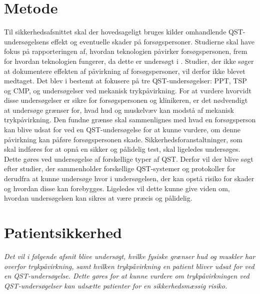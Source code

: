 \section{Metode}
Til sikkerhedsafsnittet skal der hovedsageligt bruges kilder omhandlende QST-undersøgelsens effekt og eventuelle skader på forsøgspersoner. Studierne skal have fokus på rapporteringen af, hvordan teknologien påvirker forsøgspersonen, frem for hvordan teknologien fungerer, da dette er undersøgt i . Studier, der ikke søger at dokumentere effekten af påvirkning af forsøgspersoner, vil derfor ikke blevet medtaget. Det blev i  bestemt at fokusere på tre QST-undersøgelser: PPT, TSP og CMP, og undersøgelser ved mekanisk trykpåvirkning. For at vurdere hvorvidt disse undersøgelser er sikre for forsøgspersonen og klinikeren, er det nødvendigt at undersøge grænser for, hvad hud og muskelvæv kan modstå af mekanisk trykpåvirkning. Den fundne grænse skal sammenlignes med hvad en forsøgsperson kan blive udsat for ved en QST-undersøgelse for at kunne vurdere, om denne påvirkning kan påføre forsøgspersonen skade. Sikkerhedsforanstaltninger, som skal indføres for at opnå en sikker og pålidelig test, skal ligeledes undersøges. Dette gøres ved undersøgelse af forskellige typer af QST. Derfor vil der blive søgt efter studier, der sammenholder forskellige QST-systemer og protokoller for derudfra at kunne undersøge hvor i undersøgelsen, der kan opstå risiko for skader og hvordan disse kan forebygges. Ligeledes vil dette kunne give viden om, hvordan undersøgelsen kan sikres at være præcis og pålidelig. \citep{HTAcore}

\section{Patientsikkerhed}
\textit{Det vil i følgende afsnit blive undersøgt, hvilke fysiske grænser hud og muskler har overfor trykpåvirkning, samt hvilken trykpåvirkning en patient bliver udsat for ved en QST-undersøgelse. Dette gøres for at kunne vurdere om trykpåvirkningen ved QST-undersøgelser kan udsætte patienter for en sikkerhedsmæssig risiko.}

